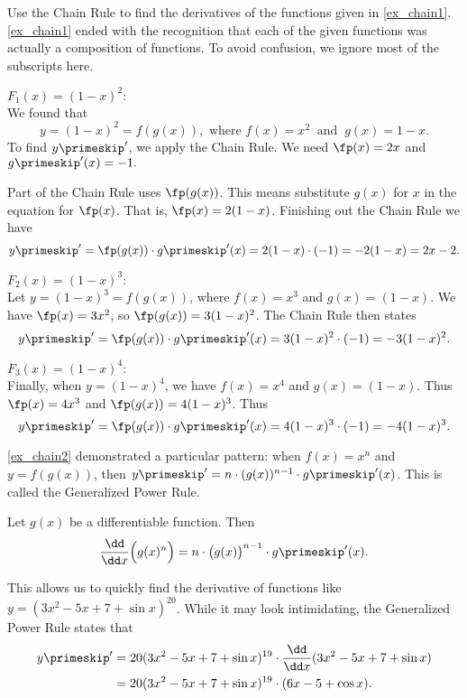 \begin{example}\label{ex_chain2}%
Use the Chain Rule to find the derivatives of the functions given in \autoref{ex_chain1}.
\solution
\autoref{ex_chain1} ended with the recognition that each of the given functions was actually a composition of functions. To avoid confusion, we ignore most of the subscripts here.

\noindent $F_1(x) = (1-x)^2:$\\
\indent We found that
\[y=(1-x)^2 = f(g(x)), \text{ where } f(x) = x^2\ \text{ and }\ g(x) = 1-x.\]
To find $y\primeskip'$, we apply the Chain Rule. We need $\fp(x)=2x$ and $g\primeskip'(x)=-1.$

Part of the Chain Rule uses $\fp(g(x))$. This means substitute $g(x)$ for $x$ in the equation for $\fp(x)$. That is, $\fp(x) = 2(1-x)$.  Finishing out the Chain Rule we have
\[y\primeskip' = \fp(g(x))\cdot g\primeskip'(x) = 2(1-x)\cdot (-1) = -2(1-x)= 2x-2.\]

\noindent $F_2(x) = (1-x)^3$:\\
\indent Let $y = (1-x)^3 = f(g(x))$, where $f(x) = x^3$ and $g(x) = (1-x)$. We have $\fp(x) = 3x^2$, so $\fp(g(x)) = 3(1-x)^2$. The Chain Rule then states
\[y\primeskip' = \fp(g(x))\cdot g\primeskip'(x) = 3(1-x)^2\cdot(-1) = -3(1-x)^2.\]

\noindent $F_3(x) = (1-x)^4$:\\
\indent Finally, when $y = (1-x)^4$, we have $f(x)= x^4$ and $g(x) = (1-x)$. Thus $\fp(x) = 4x^3$ and $\fp(g(x)) = 4(1-x)^3$. Thus
\[y\primeskip' = \fp(g(x))\cdot g\primeskip'(x) = 4(1-x)^3\cdot (-1) = -4(1-x)^3.\]
\end{example}

\autoref{ex_chain2} demonstrated a particular pattern: when $f(x)=x^n$ and $y=f(g(x))$, then $y\primeskip' =n\cdot (g(x))^{n-1}\cdot g\primeskip'(x)$. This  is called the Generalized Power Rule.

\begin{theorem}\label{thm:gen_power_rule}%
Let $g(x)$ be a differentiable function. Then
\[\frac{\dd}{\dd x}\Bigl(g(x)^n\Bigr) = n\cdot \bigl(g(x)\bigr)^{n-1}\cdot g\primeskip'(x).\]
\end{theorem}

This allows us to quickly find the derivative of functions like $y = (3x^2-5x+7+\sin x)^{20}$. While it may look intimidating, the Generalized Power Rule states that
\begin{align*}
y\primeskip'
&= 20(3x^2 -5x +7 + \sin x)^{19} \cdot  \frac{\dd}{\dd x} (3x^2 -5x +7 + \sin x)\\
&= 20(3x^2-5x+7+\sin x)^{19}\cdot (6x-5+\cos x).
\end{align*}

